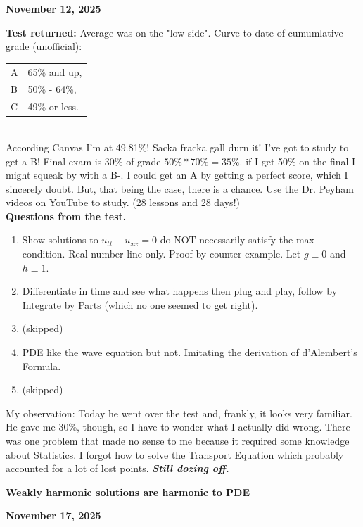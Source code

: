 \documentclass[12pt,a4paper]{report}
\begin{document}
{\newpage
\textbf{\Large{November 12, 2025}}

\textbf{Test returned:} Average was on the "low side".  Curve to date of cumumlative grade (unofficial):\\
\begin{tabular}{ll}
	 A & 65\% and up,\\
	 B & 50\% - 64\%,\\
	 C & 49\% or less.
\end{tabular}
\\

According Canvas I'm at 49.81\%!  Sacka fracka gall durn it!  I've got to study to get a B!  Final exam is 30\% of grade $50\% * 70\% = 35\%.$  if I get 50\% on the final I might squeak by with a B-.  I could get an A by getting a perfect score, which I sincerely doubt.  But, that being the case, there is a chance.  Use the Dr. Peyham videos on YouTube to study.  (28 lessons and 28 days!)\\

\textbf{Questions from the test.}
\begin{enumerate}
	\item Show solutions to $u_{tt}-u_{xx}=0$ do NOT necessarily satisfy the max condition.  Real number line only.  Proof by counter example.  Let $g \equiv 0$ and $h \equiv 1$.
	
	\item Differentiate in time and see what happens then plug and play, follow by Integrate by Parts (which no one seemed to get right).
	
	\item (skipped)
	
	\item PDE like the wave equation but not.  Imitating the derivation of d'Alembert's Formula.
	
	\item (skipped)
\end{enumerate}

My observation:  Today he went over the test and, frankly, it looks very familiar.  He gave me 30\%, though, so I have to wonder what I actually did wrong.  There was one problem that made no sense to me because it required some knowledge about Statistics.  I forgot how to solve the Transport Equation which probably accounted for a lot of lost points.  \textbf{\textit{Still dozing off.}}

\HLINE
\textbf{\Large{Weakly harmonic solutions are harmonic to PDE}}

\newpage
\textbf{\Large{November 17, 2025}}\\

}
\end{document}
